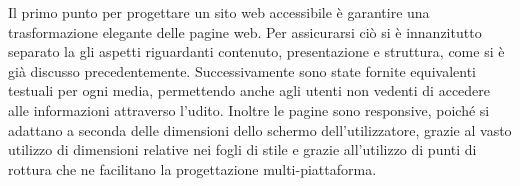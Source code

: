 Il primo punto per progettare un sito web accessibile è garantire una trasformazione elegante delle pagine web. Per assicurarsi ciò si è innanzitutto separato la gli aspetti riguardanti contenuto, presentazione e struttura, come si è già discusso precedentemente. Successivamente sono state fornite equivalenti testuali per ogni media, permettendo anche agli utenti non vedenti di accedere alle informazioni attraverso l'udito. Inoltre le pagine sono responsive, poiché si adattano a seconda delle dimensioni dello schermo dell'utilizzatore, grazie al vasto utilizzo di dimensioni relative nei fogli di stile e grazie all'utilizzo di punti di rottura che ne facilitano la progettazione multi-piattaforma.